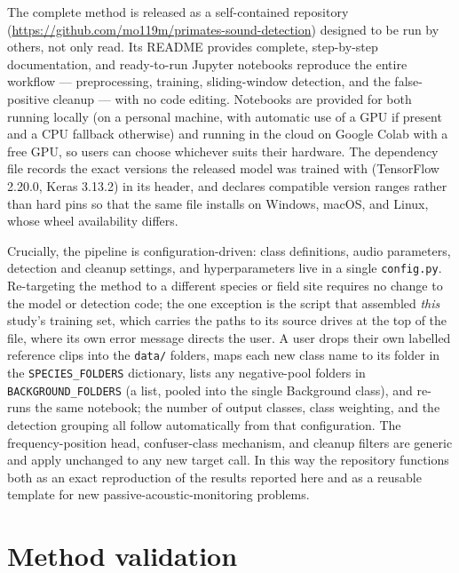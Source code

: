 \documentclass[review,3p,times]{elsarticle}
\begin{document}
The complete method is released as a self-contained repository
(\url{https://github.com/mo119m/primates-sound-detection}) designed to be run by
others, not only read. Its README provides complete, step-by-step documentation,
and ready-to-run Jupyter notebooks reproduce the entire workflow --- preprocessing,
training, sliding-window detection, and the false-positive cleanup
--- with no code editing. Notebooks are provided for both running
locally (on a personal machine, with automatic use of a GPU if present and a
CPU fallback otherwise) and running in the cloud on Google Colab with a free
GPU, so users can choose whichever suits their hardware. The dependency file
records the exact versions the released model was trained with (TensorFlow
2.20.0, Keras 3.13.2) in its header, and declares compatible version ranges
rather than hard pins so that the same file installs on Windows, macOS, and
Linux, whose wheel availability differs.

Crucially, the pipeline is configuration-driven: class definitions, audio
parameters, detection and cleanup settings, and hyperparameters live in a
single \texttt{config.py}. Re-targeting the method to a different species or
field site requires no change to the model or detection code; the one
exception is the script that assembled \emph{this} study's training set, which
carries the paths to its source drives at the top of the file, where its own
error message directs the user. A user drops their own labelled reference
clips into the \texttt{data/} folders, maps each new class name to its folder
in the \texttt{SPECIES\_FOLDERS} dictionary, lists any negative-pool folders
in \texttt{BACKGROUND\_FOLDERS} (a list, pooled into the single Background
class), and
re-runs the same notebook; the number of output classes, class weighting, and
the detection grouping all follow automatically from that configuration. The
frequency-position head, confuser-class mechanism, and cleanup filters are
generic and apply unchanged to any new target call. In this way the repository
functions both as an exact reproduction of the results reported here and as a
reusable template for new passive-acoustic-monitoring problems.

\section*{Method validation}
\end{document}
